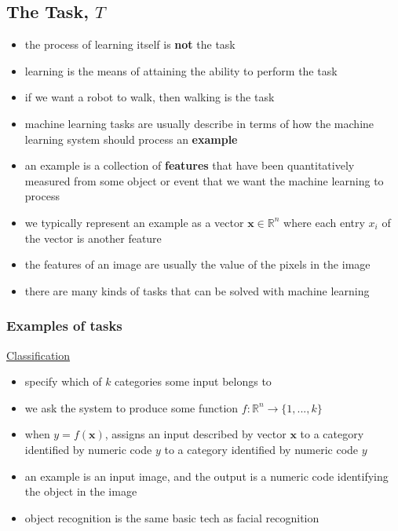 \documentclass[11pt, twocolumn]{report}
\def\realnumbers{\mathbb{R}}
\begin{document}
\subsection{The Task, $T$}
\begin{itemize}
  \item the process of learning itself is \textbf{not} the task
  \item learning is the means of attaining the ability to perform the task
  \item if we want a robot to walk, then walking is the task
  \item machine learning tasks are usually describe in terms of how the machine
    learning system should process an \textbf{example}
  \item an example is a collection of \textbf{features} that have been
    quantitatively measured from some object or event that we want the machine
    learning to process
  \item we typically represent an example as a vector $\bm{x} \in
    \realnumbers^n$ where each entry $x_i$ of the vector is another feature
  \item the features of an image are usually the value of the pixels in the
    image
  \item there are many kinds of tasks that can be solved with machine
    learning
\end{itemize}

\subsubsection{Examples of tasks}

\underline{Classification}
\begin{itemize}
  \item specify which of $k$ categories some input belongs to
  \item we ask the system to produce some function $f : \realnumbers^n \to
    \{1,...,k\}$
  \item when $y = f(\bm{x})$, assigns an input described by vector $\bm{x}$ to
    a category identified by numeric code $y$ to a category identified by
    numeric code $y$
  \item an example is an input image, and the output is a numeric code
    identifying the object in the image
  \item object recognition is the same basic tech as facial recognition
\end{itemize}
\end{document}
